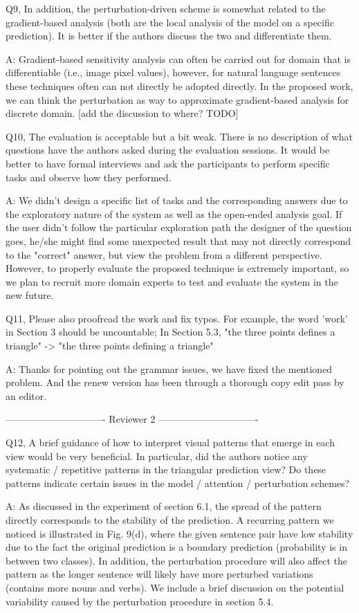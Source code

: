 Q9, In addition, the perturbation-driven scheme is somewhat related to the gradient-based analysis (both are the local analysis of the model on a specific prediction). It is better if the authors discuss the two and differentiate them.

A: Gradient-based sensitivity analysis can often be carried out for domain that is differentiable (i.e., image pixel values), however, for natural language sentences these techniques often can not directly be adopted directly. In the proposed work, we can think the perturbation as way to approximate gradient-based analysis for discrete domain. [add the discussion to where? TODO]

Q10, The evaluation is acceptable but a bit weak. There is no description of what questions have the authors asked during the evaluation sessions. It would be better to have formal interviews and ask the participants to perform specific tasks and observe how they performed.

A: We didn't design a specific list of tasks and the corresponding answers due to the exploratory nature of the system as well as the open-ended analysis goal. If the user didn't follow the particular exploration path the designer of the question goes, he/she might find some unexpected result that may not directly correspond to the "correct" answer, but view the problem from a different perspective. However, to properly evaluate the proposed technique is extremely important, so we plan to recruit more domain experts to test and evaluate the system in the new future.

Q11, Please also proofread the work and fix typos. For example, the word 'work' in Section 3 should be uncountable; In Section 5.3, "the three points defines a triangle" -> "the three points defining a triangle"

A: Thanks for pointing out the grammar issues, we have fixed the mentioned problem. And the renew version has been through a thorough copy edit pass by an editor.

------------------------------- Reviewer 2 -------------------------------

Q12, A brief guidance of how to interpret visual patterns that emerge in each view would be very beneficial. In particular, did the authors notice any systematic / repetitive patterns in the triangular prediction view? Do these patterns indicate certain issues in the model / attention / perturbation schemes?

A: As discussed in the experiment of section 6.1, the spread of the pattern directly corresponds to the stability of the prediction. A recurring pattern we noticed is illustrated in Fig. 9(d), where the given sentence pair have low stability due to the fact the original prediction is a boundary prediction (probability is in between two classes). In addition, the perturbation procedure will also affect the pattern as the longer sentence will likely have more perturbed variations (contains more nouns and verbs). We include a brief discussion on the potential variability caused by the perturbation procedure in section 5.4.

